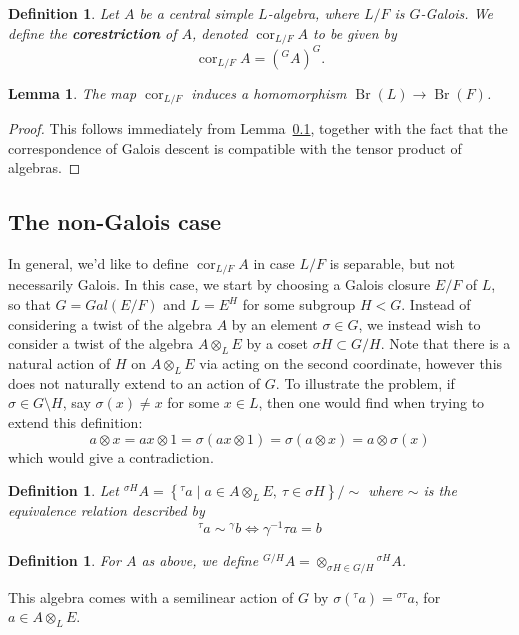 \documentclass[12pt]{report}
\theoremstyle{plain}
\newtheorem{defn}[thm]{Definition}
\newtheorem{lem}[thm]{Lemma}
\newcommand{\oper}[1]{\operatorname{#1}}
\newcommand{\cores}{\oper{cor}}
\newcommand{\Br}{\oper{Br}}
\newcommand{\Xb}[1]{\textbf{#1}\index{#1}}
\begin{document}
\begin{defn}
Let $A$ be a central simple $L$-algebra, where $L/F$ is $G$-Galois. We
define the \Xb{corestriction} of $A$, denoted $\cores_{L/F} A$ to be given by 
\[\cores_{L/F} A = \left({}^G A\right)^G.\]
\end{defn}

\begin{lem}
The map $\cores_{L/F}$ induces a homomorphism $\Br(L) \to \Br(F)$.
\end{lem}
\begin{proof}
This follows immediately from Lemma~\ref{}, together with the fact that the
correspondence of Galois descent is compatible with the tensor product of
algebras.
\end{proof}

\subsection{The non-Galois case}

In general, we'd like to define $\cores_{L/F} A$ in case $L/F$ is separable,
but not necessarily Galois. In this case, we start by choosing a Galois
closure $E/F$ of $L$, so that $G = Gal(E/F)$ and $L = E^H$ for some
subgroup $H < G$. Instead of considering a twist of the algebra $A$ by an
element $\sigma \in G$, we instead wish to consider a twist of the algebra
$A \otimes_L E$ by a coset $\sigma H \subset G/H$. Note that there is a
natural action of $H$ on $A \otimes_L E$ via acting on the second
coordinate, however this does not naturally extend to an action of $G$. To
illustrate the problem, if $\sigma \in G \setminus H$, say $\sigma(x) \neq
x$ for some $x \in L$, then one would find when trying to extend this
definition:
\[ a \otimes x = ax \otimes 1 = \sigma(a x \otimes 1) = \sigma (a \otimes
x) = a \otimes \sigma(x) \]
which would give a contradiction.

\begin{defn}
Let $^{\sigma H} A = \left\{ ^\tau a \mid a \in A \otimes_L E, \ \tau \in \sigma H \right\}/\sim$
where $\sim$ is the equivalence relation described by
\[ {}^\tau a \sim {}^\gamma b \iff \gamma^{-1} \tau a = b \]
\end{defn}

\begin{defn}
For $A$ as above, we define $^{G/H} A = \otimes_{\sigma H \in G/H}
{}^{\sigma H} A$.
\end{defn}

This algebra comes with a semilinear action of $G$ by $\sigma({}^\tau a) =
{}^{\sigma\tau} a$, for $a \in A \otimes_L E$.
\end{document}
